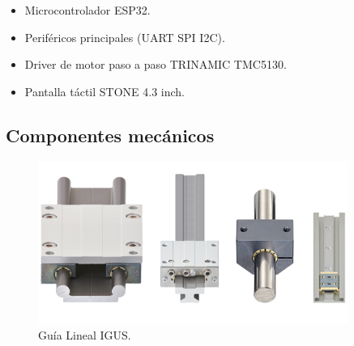 \begin{itemize}
\item Microcontrolador ESP32. 
\item Periféricos principales (UART SPI I2C). 
\item Driver de motor paso a paso TRINAMIC  TMC5130.
\item Pantalla táctil STONE 4.3 inch. 
\end{itemize}

\subsection{Componentes mecánicos}

\begin{figure}[ht]
\centering 
\includegraphics[width=0.9\textwidth]{./Figures/guias.png}
\caption{Guía Lineal IGUS.}
\label{fig:equipo_mecánico}
\end{figure}
\vspace{25px}


